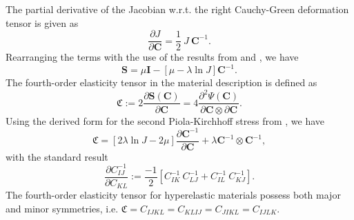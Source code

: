 The partial derivative of the Jacobian w.r.t. the right Cauchy-Green deformation tensor is given as \cite[see][page 46 Equation (3.124)]{Wriggers2008}
\begin{equation}
\dfrac{\partial J}{\partial \mathbf{C}} = \dfrac{1}{2} \ J \ \mathbf{C}^{-1}.
\label{eq:2.5}
\end{equation}
Rearranging the terms with the use of the results from  and , we have
\begin{equation}
\mathbf{S} = \mu \mathbf{I} - \left[ \mu - \lambda \ln J \right] \mathbf{C}^{-1}.
\label{eq:2.6}
\end{equation}
The fourth-order elasticity tensor in the material description is defined as 
\begin{equation}
\mathfrak{C} := 2 \dfrac{\partial \mathbf{S}(\mathbf{C})}{\partial \mathbf{C}} = 4 \dfrac{\partial^2 \Psi (\mathbf{C})}{\partial \mathbf{C} \otimes \partial \mathbf{C}}.
\label{eq:2.6.2}
\end{equation}
Using the derived form for the second Piola-Kirchhoff stress from , we have
\begin{equation}
\mathfrak{C} = \left[ 2 \lambda \ln J - 2 \mu \right]\dfrac{\partial \mathbf{C}^{-1}}{\partial \mathbf{C}} + \lambda \mathbf{C}^{-1} \otimes \mathbf{C}^{-1},
\end{equation}
with the standard result \cite[see][page 519]{Wriggers2008}
\begin{equation}
\dfrac{\partial C^{-1}_{IJ}}{\partial C_{KL}} := \dfrac{-1}{2} \left[ C^{-1}_{IK} \ C^{-1}_{LJ} + C^{-1}_{IL} \ C^{-1}_{KJ} \right].
\end{equation}
The fourth-order elasticity tensor for hyperelastic materials possess both major and minor symmetries, i.e. $\mathfrak{C} = C_{IJKL} = C_{KLIJ} = C_{JIKL} = C_{IJLK}$.


